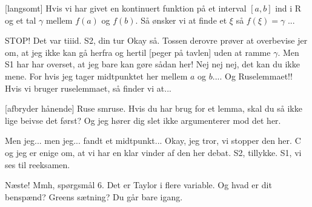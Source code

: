 \documentclass[a4paper,11pt]{article}
\begin{document}
\begin{sketch}
[langsomt] Hvis vi har givet en kontinuert funktion på et interval $[a,b]$ ind i R og et tal $\gamma$ mellem $f(a)$ og $f(b)$. Så ønsker vi at finde et $\xi$ så $f(\xi)=\gamma$ ...

 STOP! Det var tiiid. S2, din tur
 Okay så. Tossen derovre prøver at overbevise jer om, at
jeg ikke kan gå herfra og hertil [peger på tavlen] uden at ramme $\gamma$. Men S1 har har overset, at jeg bare kan gøre sådan her!
 Nej nej nej, det kan du ikke mene. For hvis jeg tager midtpunktet her mellem $a$ og $b$....
 Og Ruselemmaet!! Hvis vi bruger ruselemmaet, så finder vi at...

[afbryder hånende] Ruse smruse. Hvis du har brug for et lemma, skal du så ikke lige beivse det først? Og jeg hører dig slet ikke argumenterer mod det her.

 Men jeg... men jeg... fandt et midtpunkt...
 Okay, jeg tror, vi stopper den her. C og jeg er enige om, at vi har en klar vinder af den her debat. S2, tillykke. S1, vi ses til reeksamen.


 Næste!
 Mmh, spørgsmål 6. Det er Taylor i flere variable. Og hvad er dit benspænd?
 Greens sætning? 
 Du går bare igang. 

\end{sketch}
\end{document}
